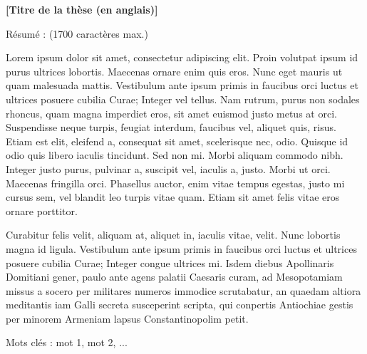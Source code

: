 {\vfill

\begin{center}
	\large \textbf{[Titre de la th\`ese (en anglais)]}
\end{center}

\begin{framed}
	\begin{minipage}{\dimexpr\textwidth-2\fboxrule-2\fboxsep}
	R\'esum\'e : (1700 caract\`eres max.)\par
	Lorem ipsum dolor sit amet, consectetur adipiscing elit. Proin volutpat ipsum id purus ultrices lobortis. Maecenas ornare enim quis eros. Nunc eget mauris ut quam malesuada mattis. Vestibulum ante ipsum primis in faucibus orci luctus et ultrices posuere cubilia Curae; Integer vel tellus. Nam rutrum, purus non sodales rhoncus, quam magna imperdiet eros, sit amet euismod justo metus at orci. Suspendisse neque turpis, feugiat interdum, faucibus vel, aliquet quis, risus. Etiam est elit, eleifend a, consequat sit amet, scelerisque nec, odio. Quisque id odio quis libero iaculis tincidunt. Sed non mi. Morbi aliquam commodo nibh. Integer justo purus, pulvinar a, suscipit vel, iaculis a, justo. Morbi ut orci. Maecenas fringilla orci. Phasellus auctor, enim vitae tempus egestas, justo mi cursus sem, vel blandit leo turpis vitae quam. Etiam sit amet felis vitae eros ornare porttitor.\par
	Curabitur felis velit, aliquam at, aliquet in, iaculis vitae, velit. Nunc lobortis magna id ligula. Vestibulum ante ipsum primis in faucibus orci luctus et ultrices posuere cubilia Curae; Integer congue ultrices mi.
	Isdem diebus Apollinaris Domitiani gener, paulo ante agens palatii Caesaris curam, ad Mesopotamiam missus a socero per militares numeros immodice scrutabatur, an quaedam altiora meditantis iam Galli secreta susceperint scripta, qui conpertis Antiochiae gestis per minorem Armeniam lapsus Constantinopolim petit.\par
Mots cl\'es : mot 1, mot 2, ...
	\end{minipage}
\end{framed}

}
